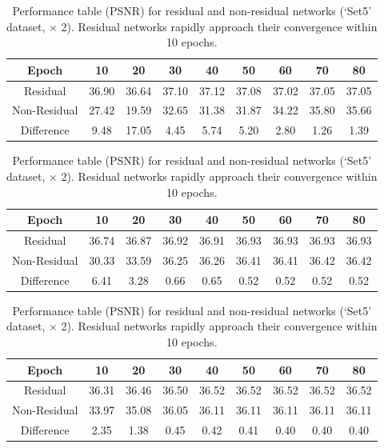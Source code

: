\documentclass[10pt,twocolumn,letterpaper]{article}
\begin{document}
\begin{table}
\centering
\begin{subtable}[t]{0.9\linewidth}
\centering
\begin{tabular}{|c||c|c|c|c|c|c|c|c|}
\hline
 Epoch& 10& 20& 30& 40& 50& 60& 70& 80\\\hline
 Residual& \color{red}36.90& 36.64& 37.10& 37.12& 37.08& 37.02& 37.05&  37.05\\
 Non-Residual&  \color{red}27.42& 19.59& 32.65& 31.38& 31.87& 34.22& 35.80& 35.66\\\hline
 Difference&  \color{red} 9.48& 17.05& 4.45& 5.74& 5.20& 2.80& 1.26& 1.39\\\hline
\end{tabular}
\caption{Initial learning rate 0.1}
\end{subtable}
\begin{subtable}[t]{0.9\linewidth}
\centering
\begin{tabular}{|c||c|c|c|c|c|c|c|c|}
\hline
 Epoch& 10& 20& 30& 40& 50& 60& 70& 80\\\hline
 Residual& \color{red}36.74& 36.87& 36.92& 36.91& 36.93& 36.93& 36.93&  36.93\\
 Non-Residual& \color{red}30.33& 33.59& 36.25& 36.26& 36.41& 36.41& 36.42&  36.42\\\hline
 Difference& \color{red}6.41& 3.28& 0.66& 0.65& 0.52& 0.52& 0.52&  0.52\\\hline
\end{tabular}
\caption{Initial learning rate 0.01}
\end{subtable}
\begin{subtable}[t]{0.9\linewidth}
\centering
\begin{tabular}{|c||c|c|c|c|c|c|c|c|}
\hline
 Epoch& 10& 20& 30& 40& 50& 60& 70& 80\\\hline
 Residual& \color{red}36.31& 36.46& 36.50& 36.52& 36.52& 36.52& 36.52&  36.52\\
 Non-Residual& \color{red}33.97& 35.08& 36.05& 36.11& 36.11& 36.11& 36.11&  36.11\\\hline
 Difference& \color{red}2.35& 1.38& 0.45& 0.42& 0.41& 0.40& 0.40&  0.40\\\hline
\end{tabular}
\caption{Initial learning rate 0.001}
\end{subtable}
\caption{Performance table (PSNR) for residual and non-residual networks (`Set5' dataset, $\times$ 2). Residual networks rapidly approach their convergence within 10 epochs.}
\end{table}
\end{document}
